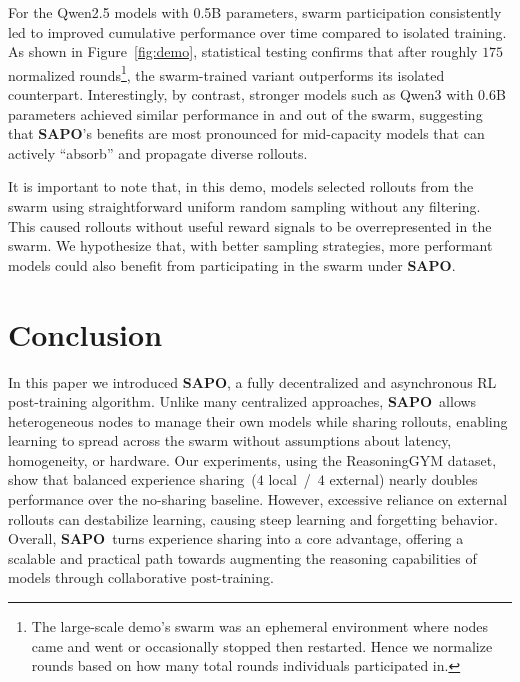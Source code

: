 \documentclass[11pt, a4paper, logo, singlecolumn, copyright]{gensyn}
\newcommand{\SAPO}{\textbf{SAPO}}
\begin{document}
For the Qwen2.5 models with 0.5B parameters, swarm participation consistently led to improved cumulative performance over time compared to isolated training. As shown in Figure~\ref{fig:demo}, statistical testing confirms that after roughly $175$ normalized rounds\footnote{The large-scale demo's swarm was an ephemeral environment where nodes came and went or occasionally stopped then restarted. Hence we normalize rounds based on how many total rounds individuals participated in.}, the swarm-trained variant outperforms its isolated counterpart. Interestingly, by contrast, stronger models such as Qwen3 with 0.6B parameters achieved similar performance in and out of the swarm, suggesting that \SAPO’s benefits are most pronounced for mid-capacity models that can actively ``absorb'' and propagate diverse rollouts. 

It is important to note that, in this demo, models selected rollouts from the swarm using straightforward uniform random sampling without any filtering. This caused rollouts without useful reward signals to be overrepresented in the swarm. We hypothesize that, with better sampling strategies, more performant models could also benefit from participating in the swarm under \SAPO.


\section{Conclusion}\label{sec:conclusion}
In this paper we introduced \SAPO, a fully decentralized and asynchronous RL post-training algorithm. Unlike many centralized approaches, \SAPO~allows heterogeneous nodes to manage their own models while sharing rollouts, enabling learning to spread across the swarm without assumptions about latency, homogeneity, or hardware. Our experiments, using the ReasoningGYM dataset, show that balanced experience sharing~($4$ local~/~$4$ external) nearly doubles performance over the no-sharing baseline. However, excessive reliance on external rollouts can destabilize learning, causing steep learning and forgetting behavior. Overall, \SAPO~turns experience sharing into a core advantage, offering a scalable and practical path towards augmenting the reasoning capabilities of models through collaborative post-training.
\end{document}
